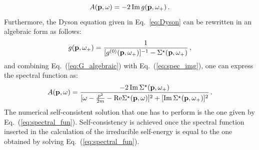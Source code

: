 \begin{equation}
\label{eq:spec_img}
A({\bf p},\omega)=-2 \, {\rm Im} \, g({\bf p},\omega_+)\,.
\end{equation}
Furthermore, the Dyson equation given in Eq.~\eqref{eq:Dyson} can be rewritten in an algebraic form as follows:
\begin{equation}
g({\bf p},\omega_+)=\frac{1}{[g^{(0)}({\bf p},\omega_+)]^{-1}-\Sigma^\star({\bf p},\omega_+)}\,,
\label{eq:G_algebraic}
\end{equation}
and combining Eq.~(\ref{eq:G_algebraic}) with Eq.~(\ref{eq:spec_img}),
one can express the spectral function as:
\begin{equation}
A({\bf p},\omega)=\frac{-2 \, \mathrm{Im} \, \Sigma^\star({\bf p},\omega_+)}
{[\omega-\frac{p^2}{2m}-\mathrm{Re}\Sigma^\star({\bf p},\omega)]^2+[\rm{Im} \, \Sigma^\star({\bf p},\omega_+)]^2} \,.
\label{eq:spectral_fun}
\end{equation}
The numerical self-consistent solution that one has to perform is the one given by Eq.~(\ref{eq:spectral_fun}). Self-consistency is achieved once the spectral function inserted in the calculation of the irreducible self-energy is equal to the one obtained by solving Eq.~(\ref{eq:spectral_fun}).

